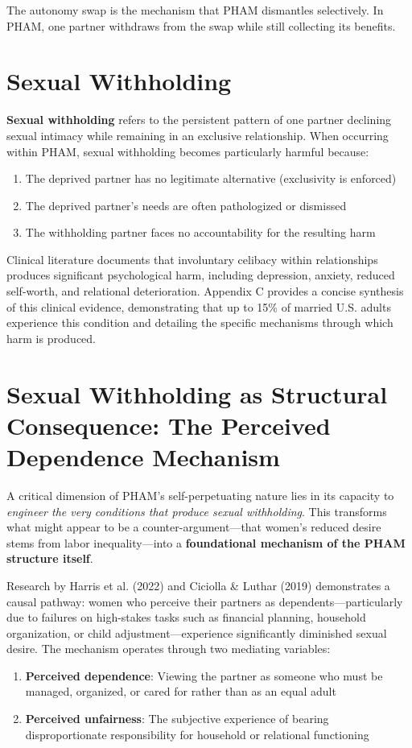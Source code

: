 \documentclass[12pt,openany]{book}
\numberwithin{equation}{chapter}
\begin{document}
The autonomy swap is the mechanism that PHAM dismantles selectively. In PHAM, one partner withdraws from the swap while still collecting its benefits.

\section{Sexual Withholding}

\textbf{Sexual withholding} refers to the persistent pattern of one partner declining sexual intimacy while remaining in an exclusive relationship. When occurring within PHAM, sexual withholding becomes particularly harmful because:

\begin{enumerate}[label=(\alph*)]
    \item The deprived partner has no legitimate alternative (exclusivity is enforced)
    \item The deprived partner's needs are often pathologized or dismissed
    \item The withholding partner faces no accountability for the resulting harm
\end{enumerate}

Clinical literature documents that involuntary celibacy within relationships produces significant psychological harm, including depression, anxiety, reduced self-worth, and relational deterioration. Appendix C provides a concise synthesis of this clinical evidence, demonstrating that up to 15\% of married U.S. adults experience this condition and detailing the specific mechanisms through which harm is produced.

\section{Sexual Withholding as Structural Consequence: The Perceived Dependence Mechanism}

A critical dimension of PHAM's self-perpetuating nature lies in its capacity to \textit{engineer the very conditions that produce sexual withholding}. This transforms what might appear to be a counter-argument---that women's reduced desire stems from labor inequality---into a \textbf{foundational mechanism of the PHAM structure itself}.

Research by Harris et al. (2022) and Ciciolla \& Luthar (2019) demonstrates a causal pathway: women who perceive their partners as dependents---particularly due to failures on high-stakes tasks such as financial planning, household organization, or child adjustment---experience significantly diminished sexual desire. The mechanism operates through two mediating variables:
\begin{enumerate}
    \item \textbf{Perceived dependence}: Viewing the partner as someone who must be managed, organized, or cared for rather than as an equal adult
    \item \textbf{Perceived unfairness}: The subjective experience of bearing disproportionate responsibility for household or relational functioning
\end{enumerate}
\end{document}
